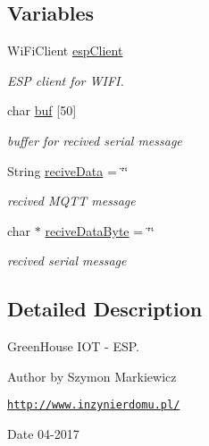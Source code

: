 \subsection*{Variables}
\begin{DoxyCompactItemize}
\item 
\mbox{\label{_e_s_p_8ino_abd77e757e4b3bb6f1e4b42b21ea9e040}} 
Wi\+Fi\+Client \hyperlink{_e_s_p_8ino_abd77e757e4b3bb6f1e4b42b21ea9e040}{esp\+Client}
\begin{DoxyCompactList}\small\item\em E\+SP client for W\+I\+FI. \end{DoxyCompactList}\item 
\mbox{\label{_e_s_p_8ino_a6792fb5519275f7b220cdc759eb45a65}} 
char \hyperlink{_e_s_p_8ino_a6792fb5519275f7b220cdc759eb45a65}{buf} \mbox{[}50\mbox{]}
\begin{DoxyCompactList}\small\item\em buffer for recived serial message \end{DoxyCompactList}\item 
\mbox{\label{_e_s_p_8ino_a59a311e0716b6bc0ed2ac22733229d69}} 
String \hyperlink{_e_s_p_8ino_a59a311e0716b6bc0ed2ac22733229d69}{recive\+Data} = \char`\"{}\char`\"{}
\begin{DoxyCompactList}\small\item\em recived M\+Q\+TT message \end{DoxyCompactList}\item 
\mbox{\label{_e_s_p_8ino_af1ed86400868e77d74d8d21a81043456}} 
char $\ast$ \hyperlink{_e_s_p_8ino_af1ed86400868e77d74d8d21a81043456}{recive\+Data\+Byte} = \char`\"{}\char`\"{}
\begin{DoxyCompactList}\small\item\em recived serial message \end{DoxyCompactList}\end{DoxyCompactItemize}


\subsection{Detailed Description}
Green\+House I\+OT -\/ E\+SP. 

\begin{DoxyAuthor}{Author}
by Szymon Markiewicz
\end{DoxyAuthor}
\href{http://www.inzynierdomu.pl/}{\tt http\+://www.\+inzynierdomu.\+pl/} \begin{DoxyDate}{Date}
04-\/2017 
\end{DoxyDate}


